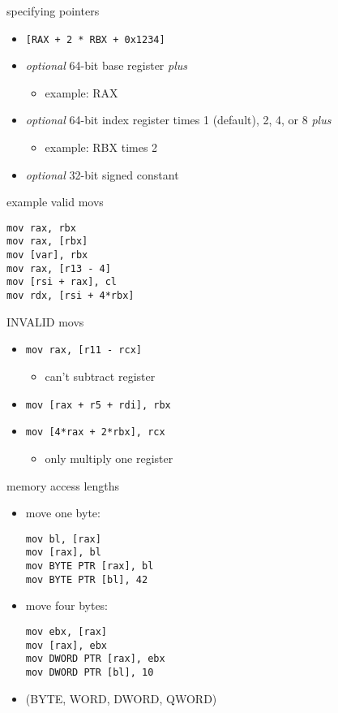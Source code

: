 \begin{frame}[fragile,label=specPtrs]{specifying pointers}
\begin{itemize}
\item \lstinline|[RAX + 2 * RBX + 0x1234]| 
\item \textit{optional} 64-bit base register \textit{plus}
    \begin{itemize}
    \item example: RAX
    \end{itemize}
\item \textit{optional} 64-bit index register times 1 (default), 2, 4, or 8 \textit{plus}
    \begin{itemize}
    \item example: RBX times 2
    \end{itemize}
\item \textit{optional} 32-bit signed constant
\end{itemize}
\end{frame}

\begin{frame}[fragile,label=validMovs]{example valid movs}
\lstset{language=myasm}
\begin{lstlisting}
mov rax, rbx
mov rax, [rbx]
mov [var], rbx
mov rax, [r13 - 4]
mov [rsi + rax], cl
mov rdx, [rsi + 4*rbx]
\end{lstlisting}
\end{frame}

\begin{frame}[fragile,label=invalidMovs]{INVALID movs}
\lstset{language=myasm}
\begin{itemize}
\item{} \lstinline|mov rax, [r11 - rcx]|
    \begin{itemize}
    \item can't subtract register
    \end{itemize}
\item{} \lstinline|mov [rax + r5 + rdi], rbx|
\item{} \lstinline|mov [4*rax + 2*rbx], rcx| 
    \begin{itemize}
    \item only multiply one register
    \end{itemize}
\end{itemize}
\end{frame}

\begin{frame}[fragile,label=valueLengths]{memory access lengths}
\lstset{language=myasm,style=small}
\begin{itemize}
\item move one byte:
\begin{lstlisting}
mov bl, [rax]
mov [rax], bl
mov BYTE PTR [rax], bl
mov BYTE PTR [bl], 42
\end{lstlisting}
\item move four bytes:
\begin{lstlisting}
mov ebx, [rax]
mov [rax], ebx
mov DWORD PTR [rax], ebx
mov DWORD PTR [bl], 10
\end{lstlisting}
\item (BYTE, WORD, DWORD, QWORD)
\end{itemize}
\end{frame}
